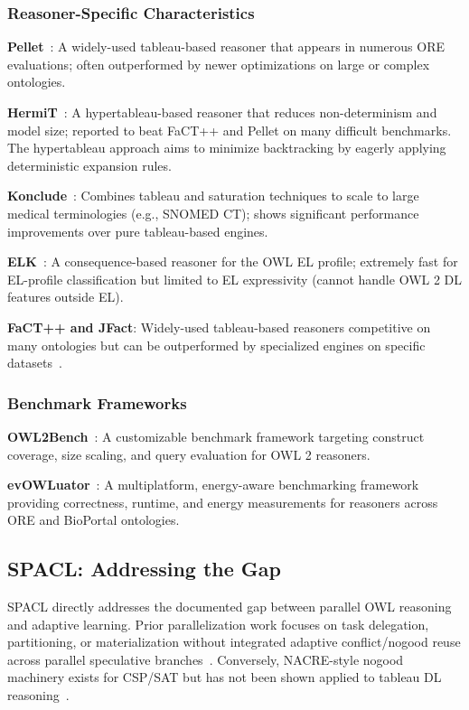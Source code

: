 \documentclass[preprint,12pt]{elsarticle}
\begin{document}
\subsubsection{Reasoner-Specific Characteristics}

\textbf{Pellet}~\cite{sirin2007pellet}: A widely-used tableau-based reasoner that appears in numerous ORE evaluations; often outperformed by newer optimizations on large or complex ontologies.

\textbf{HermiT}~\cite{glimm2014hermit}: A hypertableau-based reasoner that reduces non-determinism and model size; reported to beat FaCT++ and Pellet on many difficult benchmarks. The hypertableau approach aims to minimize backtracking by eagerly applying deterministic expansion rules.

\textbf{Konclude}~\cite{song2013complete,glimm2014coupling}: Combines tableau and saturation techniques to scale to large medical terminologies (e.g., SNOMED CT); shows significant performance improvements over pure tableau-based engines.

\textbf{ELK}~\cite{bate2018consequence}: A consequence-based reasoner for the OWL EL profile; extremely fast for EL-profile classification but limited to EL expressivity (cannot handle OWL 2 DL features outside EL).

\textbf{FaCT++ and JFact}: Widely-used tableau-based reasoners competitive on many ontologies but can be outperformed by specialized engines on specific datasets~\cite{kang2012rigorous,glimm2014hermit}.

\subsubsection{Benchmark Frameworks}

\textbf{OWL2Bench}~\cite{singh2020owl2bench}: A customizable benchmark framework targeting construct coverage, size scaling, and query evaluation for OWL 2 reasoners.

\textbf{evOWLuator}~\cite{bilenchi2021multiplatform}: A multiplatform, energy-aware benchmarking framework providing correctness, runtime, and energy measurements for reasoners across ORE and BioPortal ontologies.

\subsection{SPACL: Addressing the Gap}

SPACL directly addresses the documented gap between parallel OWL reasoning and adaptive learning. Prior parallelization work focuses on task delegation, partitioning, or materialization without integrated adaptive conflict/nogood reuse across parallel speculative branches~\cite{quan2017parallel,quan2019framework,liu2017spowl,gu2015cichlid}. Conversely, NACRE-style nogood machinery exists for CSP/SAT but has not been shown applied to tableau DL reasoning~\cite{glorian2020nacre}.
\end{document}
